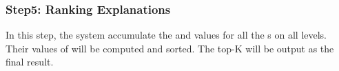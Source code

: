 

\subsubsection{Step5: Ranking Explanations}
\label{sec:extending_hi}
In this step, the system accumulate the {\intensity} and {\influence} values for all the {\explanation}s on all levels. Their values of {\newvalue} will be computed and sorted. The top-K {\explanation} will be output as the final result. 

